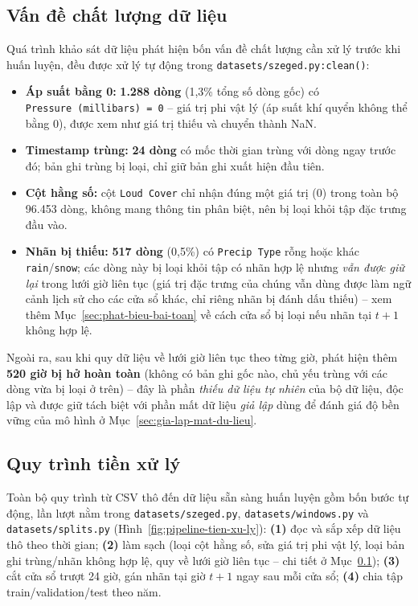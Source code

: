 \subsection{Vấn đề chất lượng dữ liệu}
\label{sec:chat-luong-du-lieu}

Quá trình khảo sát dữ liệu phát hiện bốn vấn đề chất lượng cần xử lý trước khi huấn
luyện, đều được xử lý tự động trong \texttt{datasets/szeged.py:clean()}:

\begin{itemize}
  \item \textbf{Áp suất bằng 0:} \textbf{1.288 dòng} (1,3\% tổng số dòng gốc) có
        \texttt{Pressure~(millibars)~=~0} -- giá trị phi vật lý (áp suất khí quyển không
        thể bằng 0), được xem như giá trị thiếu và chuyển thành NaN.
  \item \textbf{Timestamp trùng:} \textbf{24 dòng} có mốc thời gian trùng với dòng ngay
        trước đó; bản ghi trùng bị loại, chỉ giữ bản ghi xuất hiện đầu tiên.
  \item \textbf{Cột hằng số:} cột \texttt{Loud Cover} chỉ nhận đúng một giá trị (0) trong
        toàn bộ 96.453 dòng, không mang thông tin phân biệt, nên bị loại khỏi tập đặc
        trưng đầu vào.
  \item \textbf{Nhãn bị thiếu:} \textbf{517 dòng} (0,5\%) có \texttt{Precip Type} rỗng
        hoặc khác \texttt{rain}/\texttt{snow}; các dòng này bị loại khỏi tập có nhãn hợp lệ
        nhưng \emph{vẫn được giữ lại} trong lưới giờ liên tục (giá trị đặc trưng của chúng
        vẫn dùng được làm ngữ cảnh lịch sử cho các cửa sổ khác, chỉ riêng nhãn bị đánh dấu
        thiếu) -- xem thêm Mục~\ref{sec:phat-bieu-bai-toan} về cách cửa sổ bị loại nếu nhãn
        tại $t+1$ không hợp lệ.
\end{itemize}

Ngoài ra, sau khi quy dữ liệu về lưới giờ liên tục theo từng giờ, phát hiện thêm
\textbf{520 giờ bị hở hoàn toàn} (không có bản ghi gốc nào, chủ yếu trùng với các dòng vừa
bị loại ở trên) -- đây là phần \emph{thiếu dữ liệu tự nhiên} của bộ dữ liệu, độc lập và được
giữ tách biệt với phần mất dữ liệu \emph{giả lập} dùng để đánh giá độ bền vững của mô hình ở
Mục~\ref{sec:gia-lap-mat-du-lieu}.

\subsection{Quy trình tiền xử lý}
\label{sec:quy-trinh-tien-xu-ly}

Toàn bộ quy trình từ CSV thô đến dữ liệu sẵn sàng huấn luyện gồm bốn bước tự động, lần
lượt nằm trong \texttt{datasets/szeged.py}, \texttt{datasets/windows.py} và
\texttt{datasets/splits.py} (Hình~\ref{fig:pipeline-tien-xu-ly}): \textbf{(1)} đọc và sắp
xếp dữ liệu thô theo thời gian; \textbf{(2)} làm sạch (loại cột hằng số, sửa giá trị phi
vật lý, loại bản ghi trùng/nhãn không hợp lệ, quy về lưới giờ liên tục -- chi tiết ở
Mục~\ref{sec:chat-luong-du-lieu}); \textbf{(3)} cắt cửa sổ trượt 24 giờ, gán nhãn tại giờ
$t{+}1$ ngay sau mỗi cửa sổ; \textbf{(4)} chia tập train/validation/test theo năm.


